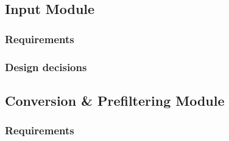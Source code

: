 \documentclass{llncs}
\begin{document}
\subsection{Input Module}
\subsubsection{Requirements}
\subsubsection{Design decisions}

\subsection{Conversion \& Prefiltering Module}
\subsubsection{Requirements}
\end{document}
